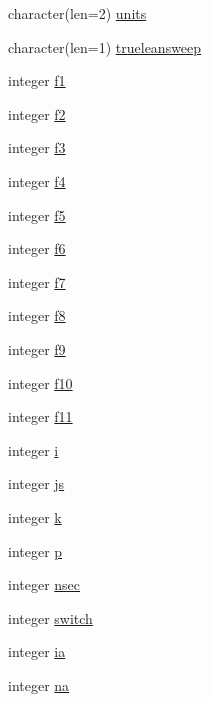 \begin{DoxyCompactItemize}
\item 
character(len=2) \hyperlink{namespaceglobvar_a5a48d5b0df94151f6ccff35f89d832ed}{units}
\item 
character(len=1) \hyperlink{namespaceglobvar_a113718364777f5700503cc4655ea8a36}{trueleansweep}
\item 
integer \hyperlink{namespaceglobvar_ad587987756a26ab8482d669091aa11e2}{f1}
\item 
integer \hyperlink{namespaceglobvar_ab013958d5d057b8aca4e06ba0daa8406}{f2}
\item 
integer \hyperlink{namespaceglobvar_a22ec31cd077818915aa449475242ebc1}{f3}
\item 
integer \hyperlink{namespaceglobvar_ac3c062c849a3ecf6de129ae085a265ae}{f4}
\item 
integer \hyperlink{namespaceglobvar_aef4e41982e8eb0e0436d5261df60a5ba}{f5}
\item 
integer \hyperlink{namespaceglobvar_a9bcf733cb3d2746a17a750550de00730}{f6}
\item 
integer \hyperlink{namespaceglobvar_ad5518ff994222c6d414b1ab14ec5ff3b}{f7}
\item 
integer \hyperlink{namespaceglobvar_a81a49408c447c53cabc16ec197a0520f}{f8}
\item 
integer \hyperlink{namespaceglobvar_ae5c9f355184c5007c6fd6e3e77ff5006}{f9}
\item 
integer \hyperlink{namespaceglobvar_a31893a074cdc83965ae93c821376be2b}{f10}
\item 
integer \hyperlink{namespaceglobvar_a8107e26d71f5d153179d812a2060f289}{f11}
\item 
integer \hyperlink{namespaceglobvar_a9b05c54fac739f587c870e529b2216f9}{i}
\item 
integer \hyperlink{namespaceglobvar_a0f5c9c2384e0fd1c79c5e07df615661f}{js}
\item 
integer \hyperlink{namespaceglobvar_ac3085057e6f2d3302a5046006457c547}{k}
\item 
integer \hyperlink{namespaceglobvar_ae7c4dc9c253893de2f413b45f223f1a9}{p}
\item 
integer \hyperlink{namespaceglobvar_a4bcc489e884542bc5eb30f17d5773278}{nsec}
\item 
integer \hyperlink{namespaceglobvar_a505145f479910632ea341b88c8333e04}{switch}
\item 
integer \hyperlink{namespaceglobvar_ae4e17de7f28c6c5fa62413a151e30d71}{ia}
\item 
integer \hyperlink{namespaceglobvar_a3153e29591fc002f684b857f0517a322}{na}
\item 

\end{DoxyCompactItemize}
